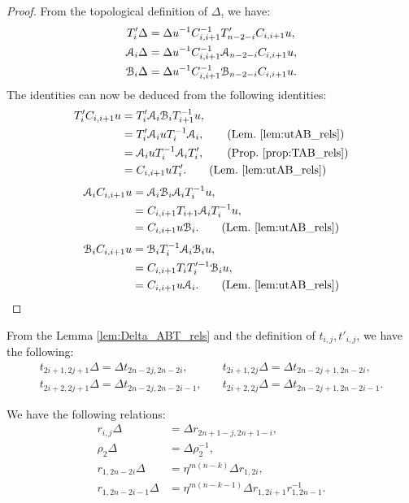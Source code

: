 \documentclass{amsart}
\begin{document}
\begin{proof}
From the topological definition of $\Delta$, we have: 
\begin{align*}
    T_i'\Delta&=\Delta u^{-1}C^{-1}_{i,i+1}T'_{n-2-i}C_{i,i+1}u,\\
    \mathcal{A}_i\Delta&=\Delta u^{-1}C^{-1}_{i,i+1}\mathcal{A}_{n-2-i}C_{i,i+1}u,\\
    \mathcal{B}_i\Delta&=\Delta u^{-1}C^{-1}_{i,i+1}\mathcal{B}_{n-2-i}C_{i,i+1}u.
\end{align*}
The identities can now be deduced from the following identities:
 \begin{align*}
T'_iC_{i,i+1}u&=T'_i\mathcal{A}_i\mathcal{B}_iT^{-1}_{i+1}u,\\
&=T'_i\mathcal{A}_iuT_i^{-1}\mathcal{A}_i, \qquad (\text{Lem.~\ref{lem:utAB_rels}})\\
&=\mathcal{A}_iuT_i^{-1}\mathcal{A}_iT'_i, \qquad (\text{Prop.~\ref{prop:TAB_rels}})\\
&=C_{i,i+1}uT'_i. \qquad (\text{Lem.~\ref{lem:utAB_rels}})
 \end{align*}
 \[
 \begin{aligned}
\mathcal{A}_iC_{i,i+1}u&=\mathcal{A}_i\mathcal{B}_i\mathcal{A}_iT^{-1}_{i}u,\\
&=C_{i,i+1}T_{i+1}\mathcal{A}_iT_i^{-1}u,\\
&=C_{i,i+1}u\mathcal{B}_i. \qquad (\text{Lem.~\ref{lem:utAB_rels}})
 \end{aligned}
 \]
 \begin{align*}
\mathcal{B}_iC_{i,i+1}u&=\mathcal{B}_iT^{-1}_{i}\mathcal{A}_i\mathcal{B}_iu,\\
&=C_{i,i+1}T_{i}T_i'^{-1}\mathcal{B}_iu,\\
&=C_{i,i+1}u\mathcal{A}_i. \qquad (\text{Lem.~\ref{lem:utAB_rels}})    
 \end{align*}
\end{proof}
From the Lemma \ref{lem:Delta_ABT_rels} and the definition of $t_{i,j},t'_{i,j}$, we have the following: 
\[
\begin{aligned}
 t_{2i+1,2j+1}\Delta=\Delta t_{2n-2j,2n-2i}, &\quad t_{2i+1,2j}\Delta=\Delta t_{2n-2j+1,2n-2i},
  \\
 t_{2i+2,2j+1}\Delta=\Delta t_{2n-2j,2n-2i-1},&\quad t_{2i+2,2j}\Delta=\Delta t_{2n-2j+1,2n-2i-1}.
\end{aligned}
\]
\begin{prop}\label{prop:r_delta_rels}

We have the following relations:
\[
\begin{aligned}
r_{i,j}\Delta&=\Delta r_{2n+1-j,2n+1-i},\\ 
\rho_2\Delta&=\Delta\rho_2^{-1},\\
r_{1,2n-2i}\Delta&=\eta^{m(n-k)}\Delta r_{1,2i},\\
r_{1,2n-2i-1}\Delta&=\eta^{m(n-k-1)}\Delta r_{1,2i+1}r^{-1}_{1,2n-1}.
\end{aligned}
\]
\end{prop}
\end{document}
